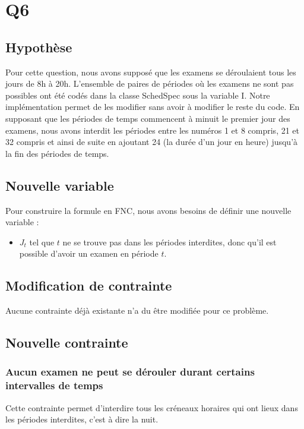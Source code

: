 \documentclass[a4paper,11pt]{article}
\begin{document}
\section{Q6}

\subsection{Hypothèse}
Pour cette question, nous avons supposé que les examens se déroulaient tous les jours de 8h à 20h. L'ensemble de paires de périodes où les examens ne sont pas possibles ont été codés dans la classe SchedSpec sous la variable I. Notre implémentation permet de les modifier sans avoir à modifier le reste du code.
En supposant que les périodes de temps commencent à minuit le premier jour des examens, nous avons interdit les périodes entre les numéros 1 et 8 compris, 21 et 32 compris et ainsi de suite en ajoutant 24 (la durée d'un jour en heure) jusqu'à la fin des périodes de temps.

\subsection{Nouvelle variable}

Pour construire la formule en FNC, nous avons besoins de définir une nouvelle variable :  
\begin{itemize}
	\item \( J_{t}\) tel que $t$ ne se trouve pas dans les périodes interdites, donc qu'il est possible d'avoir un examen en période $t$.
\end{itemize}

\subsection{Modification de contrainte}
Aucune contrainte déjà existante n'a du être modifiée pour ce problème.

\subsection{Nouvelle contrainte}

\subsubsection{Aucun examen ne peut se dérouler durant certains intervalles de temps}
Cette contrainte permet d'interdire tous les créneaux horaires qui ont lieux dans les périodes interdites, c'est à dire la nuit.
\end{document}
